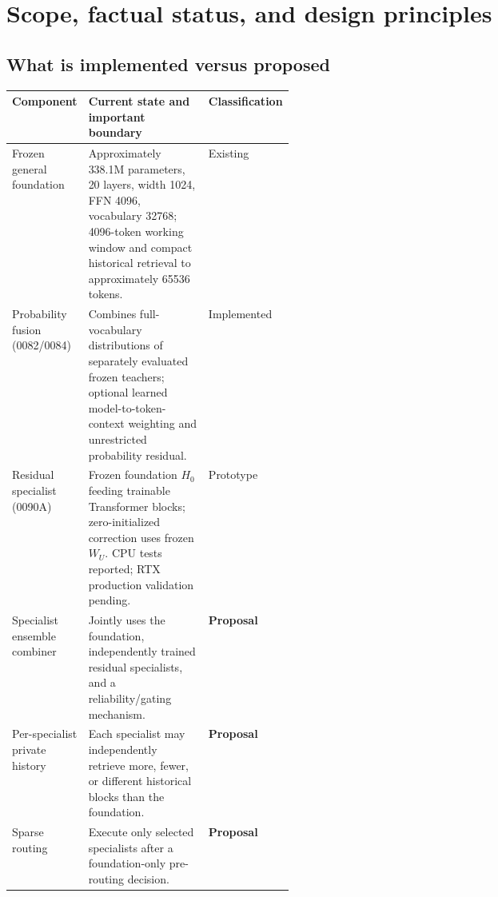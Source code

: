 \documentclass[11pt,letterpaper]{article}
\begin{document}
\section{Scope, factual status, and design principles}
\label{sec:scope}
\subsection{What is implemented versus proposed}
\begin{tabularx}{\linewidth}{@{}p{0.25\linewidth}X p{0.16\linewidth}@{}}
\toprule
Component & Current state and important boundary & Classification \\
\midrule
Frozen general foundation & Approximately 338.1M parameters, 20 layers, width 1024, FFN 4096, vocabulary 32768; 4096-token working window and compact historical retrieval to approximately 65536 tokens. & Existing \\
Probability fusion (0082/0084) & Combines full-vocabulary distributions of separately evaluated frozen teachers; optional learned model-to-token-context weighting and unrestricted probability residual. & Implemented \\
Residual specialist (0090A) & Frozen foundation $H_0$ feeding trainable Transformer blocks; zero-initialized correction uses frozen $W_U$. CPU tests reported; RTX production validation pending. & Prototype \\
Specialist ensemble combiner & Jointly uses the foundation, independently trained residual specialists, and a reliability/gating mechanism. & \textbf{Proposal} \\
Per-specialist private history & Each specialist may independently retrieve more, fewer, or different historical blocks than the foundation. & \textbf{Proposal} \\
Sparse routing & Execute only selected specialists after a foundation-only pre-routing decision. & \textbf{Proposal} \\
\bottomrule
\end{tabularx}
\end{document}

